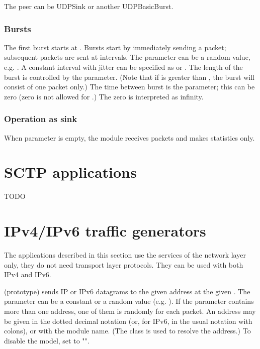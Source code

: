 The peer can be UDPSink or another UDPBasicBurst.

\subsubsection*{Bursts}

The first burst starts at . Bursts start by immediately sending
a packet; subsequent packets are sent at  intervals. The
 parameter can be a random value, e.g. .
A constant interval with jitter can be specified as 
or . The length of the burst is controlled by the
 parameter. (Note that if  is greater than
, the burst will consist of one packet only.) The time between
burst is the  parameter; this can be zero (zero is not
allowed for .) The zero  is interpreted as infinity.

\subsubsection*{Operation as sink}

When  parameter is empty, the module receives packets and makes statistics only.


\section{SCTP applications}
\label{sec:apps:sctp-applications}

TODO


\section{IPv4/IPv6 traffic generators}
\label{sec:apps:ipv4/ipv6-traffic-generators}

The applications described in this section use the services of the network
layer only, they do not need transport layer protocols.
They can be used with both IPv4 and IPv6.

 (prototype) sends IP or IPv6 datagrams to the
given address at the given .
The  parameter can be a constant or a random value (e.g.
). If the  parameter contains more than
one address, one of them is randomly for each packet. An address may be given in
the dotted decimal notation (or, for IPv6, in the usual notation with colons),
or with the module name. (The  class is used to
resolve the address.) To disable the model, set  to "".

